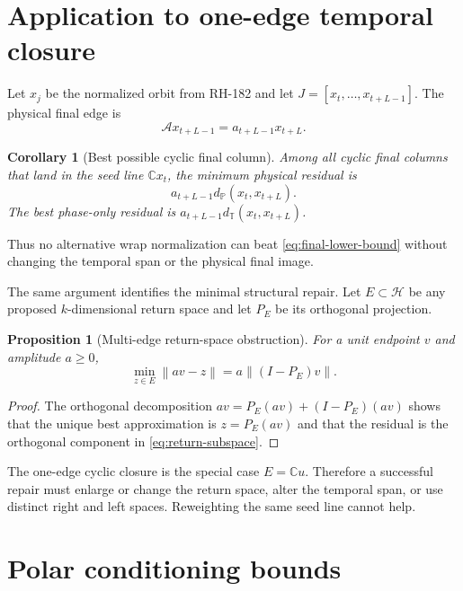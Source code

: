\documentclass[12pt]{article}
\newtheorem{proposition}[theorem]{Proposition}
\newtheorem{corollary}[theorem]{Corollary}
\theoremstyle{remark}
\newcommand{\cH}{\mathcal H}
\newcommand{\norm}[1]{\left\lVert#1\right\rVert}
\begin{document}
\section{Application to one-edge temporal closure}

Let $x_j$ be the normalized orbit from RH-182 and let
$J=[x_t,\ldots,x_{t+L-1}]$.  The physical final edge is
\begin{equation}\label{eq:physical-final-edge}
 \mathcal A x_{t+L-1}=a_{t+L-1}x_{t+L}.
\end{equation}

\begin{corollary}[Best possible cyclic final column]\label{cor:final-column}
Among all cyclic final columns that land in the seed line $\mathbb Cx_t$,
the minimum physical residual is
\begin{equation}\label{eq:final-lower-bound}
 a_{t+L-1}d_{\mathbb P}(x_t,x_{t+L}).
\end{equation}
The best phase-only residual is
$a_{t+L-1}d_{\mathbb T}(x_t,x_{t+L})$.
\end{corollary}

Thus no alternative wrap normalization can beat
\eqref{eq:final-lower-bound} without changing the temporal span or the
physical final image.

The same argument identifies the minimal structural repair.  Let
$E\subset\cH$ be any proposed $k$-dimensional return space and let $P_E$ be
its orthogonal projection.

\begin{proposition}[Multi-edge return-space obstruction]
For a unit endpoint $v$ and amplitude $a\ge0$,
\begin{equation}\label{eq:return-subspace}
 \min_{z\in E}\norm{av-z}=a\norm{(I-P_E)v}.
\end{equation}
\end{proposition}

\begin{proof}
The orthogonal decomposition $av=P_E(av)+(I-P_E)(av)$ shows that the unique
best approximation is $z=P_E(av)$ and that the residual is the orthogonal
component in \eqref{eq:return-subspace}.
\end{proof}

The one-edge cyclic closure is the special case $E=\mathbb Cu$.  Therefore a
successful repair must enlarge or change the return space, alter the
temporal span, or use distinct right and left spaces.  Reweighting the same
seed line cannot help.

\section{Polar conditioning bounds}
\end{document}
